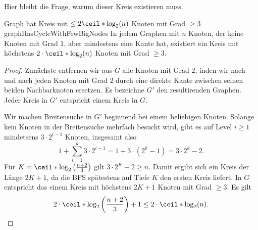 \documentclass[language=ngerman,algolist]{TemplateLecture}
\begin{document}
\begin{algorithm}[h]
    \caption{\textsc{PrimalDual-FVS2}}\label{alg:primalDualFVS2}
    \begin{algorithmic}[1]
         
        \EndWhile{}
    \end{algorithmic}
\end{algorithm}

Hier bleibt die Frage, warum dieser Kreis existieren muss.

\begin{lem}{Graph hat Kreis mit $\leq2\ceil*{\log_2(n)}$ Knoten mit Grad $\geq 3$}{graphHasCycleWithFewBigNodes}
    In jedem Graphen mit $n$ Knoten, der keine Knoten mit Grad $1$, aber mindestens eine Kante hat, existiert ein Kreis mit höchstens $2\cdot \ceil*{\log_2(n)}$ Knoten mit Grad $\geq 3$.
\end{lem}
\begin{proof}
    Zunächste entfernen wir aus $G$ alle Knoten mit Grad $2$, inden wir nach und nach jeden Knoten mit Grad $2$ durch eine direkte Kante zwischen seinen beiden Nachbarknoten ersetzen. Es bezeichne $G'$ den resultirenden Graphen. Jeder Kreis in $G'$ entspricht einem Kreis in $G$.

    Wir machen Breitensuche in $G'$ beginnend bei einem beliebigen Knoten. Solange kein Knoten in der Breitensuche mehrfach besucht wird, gibt es auf Level $i \geq 1$ mindetsens $3 \cdot 2^{i-1}$ Knoten, insgesamt also 
    \begin{equation*}
        1 + \sum_{i = 1}^k 3 \cdot 2^{i-1} = 1 + 3 \cdot (2^k - 1) = 3 \cdot 2^k - 2.
    \end{equation*}
    Für $K = \ceil*{\log_2\left( \frac{n+2}{3} \right)}$ gilt $3 \cdot 2^K - 2 \geq n$. Damit ergibt sich ein Kreis der Länge $2 K + 1$, da die BFS spätestens auf Tiefe $K$ den ersten Kreis liefert. In $G$ entspricht das einem Kreis mit höchstens $2K + 1$ Knoten mit Grad $\geq 3$. Es gilt
    \begin{equation*}
        2 \cdot \ceil*{\log_2\left( \frac{n+2}{3} \right)} + 1 \leq 2 \cdot \ceil*{\log_2(n)}. \qedhere
    \end{equation*}
\end{proof}
\end{document}
